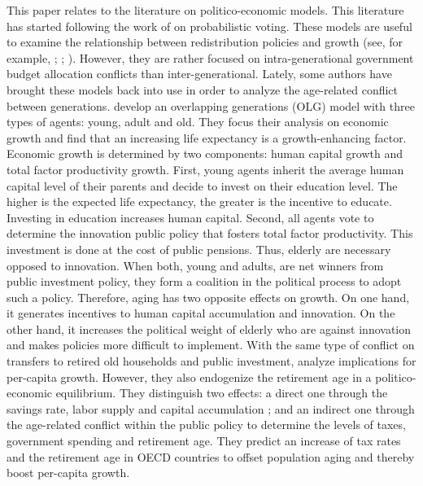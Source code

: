 This paper relates to the literature on politico-economic models. This literature has started following the work of \cite{Lindbeck1987} on probabilistic voting. These models are useful to examine the relationship between redistribution policies and growth (see, for example, \cite{Alesina1994}; \cite{Persson1994}; \cite{Krusell1997}). However, they are rather focused on intra-generational government budget allocation conflicts than inter-generational. Lately, some authors have brought these models back into use in order to analyze the age-related conflict between generations.
\cite{Lancia2012} develop an overlapping generations (OLG) model with three types of agents: young, adult and old. They focus their analysis on economic growth and find that an increasing life expectancy is a growth-enhancing factor. Economic growth is determined by two components: human capital growth and total factor productivity growth. First, young agents inherit the average human capital level of their parents and decide to invest on their education level. The higher is the expected life expectancy, the greater is the incentive to educate. Investing in education increases human capital. Second, all agents vote to determine the innovation public policy that fosters total factor productivity. This investment is done at the cost of public pensions. Thus, elderly are necessary opposed to innovation. When both, young and adults, are net winners from public investment policy, they form a coalition in the political process to adopt such a policy. Therefore, aging has two opposite effects on growth. On one hand, it generates incentives to human capital accumulation and innovation. On the other hand, it increases the political weight of elderly who are against innovation and makes policies more difficult to implement.
With the same type of conflict on transfers to retired old households and public investment, \cite{Gonzalez-Eiras2012} analyze implications for per-capita growth. However, they also endogenize the retirement age in a politico-economic equilibrium. They distinguish two effects: a direct one through the savings rate, labor supply and capital accumulation ; and an indirect one through the age-related conflict within the public policy to determine the levels of taxes, government spending and retirement age. They predict an increase of tax rates and the retirement age in OECD countries to offset population aging and thereby boost per-capita growth.


